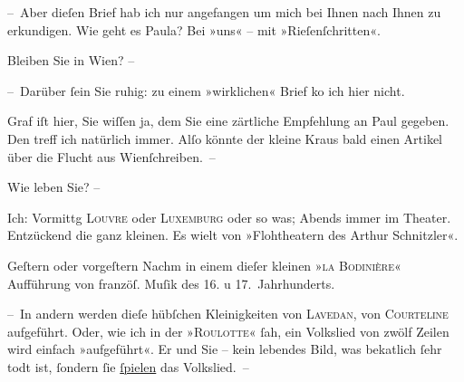 \pstart
           – Aber dieſen Brief hab ich nur angefangen um mich bei Ihnen nach Ihnen zu
               erkundigen. Wie geht es Paula? Bei »uns« – mit »Rieſen{\pb}ſchritten«.\pend
           
\pstart
           Bleiben Sie in Wien? –\pend
           
\pstart
           – Darüber{ }ſein Sie ruhig: zu einem »wirklichen« Brief ko{\geminationm} ich hier nicht.\pend
           
\pstart
           Graf iſt hier, Sie wiſſen ja, dem Sie eine
               zärtliche Empfehlung an Paul gegeben. Den
               treff ich natürlich immer. {\pb}Alſo könnte der kleine Kraus bald einen Artikel über die Flucht aus
                  Wienſchreiben. –\pend
           
\pstart
           Wie leben Sie? –\pend
           
\pstart
           Ich: Vormittg \textsc{Louvre} oder \textsc{Luxemburg} oder so was; Abends immer im Theater. Entzückend die ganz kleinen. Es wi{\geminationm}elt von »Flohtheatern des Arthur Schnitzler«.\pend
           
\pstart
           {\pb}Geſtern oder vorgeſtern Nachm in einem dieſer kleinen
                  »\textsc{la Bodinière}« Aufführung von \introOben{}franzöſ.\introOben{} Muſik des 16. u 17. Jahrhunderts.\pend
           
\pstart
           – In andern werden dieſe hübſchen Kleinigkeiten von \textsc{Lavedan}, von \textsc{Courteline} aufgeführt. Oder, wie ich \label{K_L00670-2v}\label{K_L00670-2} in der »\textsc{Roulotte}«{ }ſah, ein Volkslied von zwölf Zeilen wird einfach »aufgeführt«. Er und {\pb}Sie – kein lebendes Bild, was beka{\geminationn}tlich{ }ſehr todt ist,{ }ſondern{ }ſie \uline{ſpielen} das Volkslied. –\pend
           

